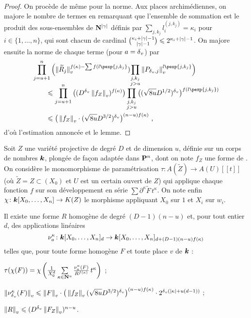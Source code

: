 \documentclass{mpg-preth}
\begin{document}
\begin{proof}
  On procède de même pour la norme. Aux places archimédiennes, on majore le
  nombre de termes en remarquant que l'ensemble de sommation est le produit des
  sous-ensembles de $\mathbf{N}^{\left\lvert\gamma\right\rvert}$ définis par $\sum_{j, k_j} l_i^ {(j, k_j)}
  = \kappa_i$ pour $i \in \{1,\ldots,n\}$, qui sont chacun de cardinal
  $\binom{\kappa_i + \left\lvert\gamma\right\rvert - 1}{\left\lvert\gamma\right\rvert - 1} \leqslant 2^{\kappa_i +
    \left\lvert\gamma\right\rvert - 1}$. On majore ensuite la norme de chaque terme (pour $a =
  {\delta\smash{_v}}$) par
  \begin{align*}
    & \prod_{j=u+1}^n \left( \nv{\smash{\widetilde R_j}}^{f(\kappa) - \sum
        f(l\pexp{j, k_j}}) \smash{\prod_{\substack{j, k_j \\ j > u}}}
      \nv{P_{\dv, j}}^{l\pexp{j, k_j}} \right) \\
    & \qquad\le \prod_{j=u+1}^n \big( (D^\dv \nv{f_Z})^{f(\kappa)} \big)
      \prod_{\substack{j, k_j \\ j > u}}  \big( (\sqrt{8u} D^{1/2})^\dv
      \big)^{f(l\pexp{j, k_j})} \\
    & \qquad\le \big( \nv{f_Z} \cdot (\sqrt{8u}D^{3/2})^\dv
      \big)^{(n-u)f(\kappa)} \pmm,
  \end{align*}
  d'où l'estimation annoncée et le lemme.
\end{proof}

\begin{lem} \label{l-param}
  Soit $Z$ une variété projective de degré $D$ et de dimension $u$, définie
  sur un corps de nombres $\boldsymbol{k}$, plongée de façon adaptée dans $\mathbf{P}^n$, dont
  on note $f_Z$ une forme de . On considère le monomorphisme de
  paramétrisation $\tau \colon A(\widetilde Z) \to A(U)[[t]]$ (où $\widetilde Z
  = Z \subset (X_0)$ et $U$ est un certain ouvert de $Z$) qui applique chaque
  fonction $f$ sur son développement en série $\sum \partial^\kappa \tilde F \,
  t^\kappa$.  On note enfin $\chi \colon \boldsymbol{k}[X_0, \ldots, X_n] \to K(Z)$ le
  morphisme appliquant $X_0$ sur $1$ et $X_i$ sur $w_i$.

  Il existe une forme $R$ homogène de degré $(D-1)(n-u)$ et, pour tout entier
  $d$, des applications linéaires \[ \nu_a^\kappa \colon \boldsymbol{k}[X_0, \ldots,
  X_n]_d \to \boldsymbol{k}[X_0, \ldots, X_n]_{d + (D-1)(n-u)f(\kappa)} \] telles que,
  pour toute forme homogène $F$ et toute place $v$ de $\boldsymbol{k}$ :
  \begin{enumthm}
    \item $\tau(\chi(F)) = \chi\left( \frac1{X_0^d} \sum\limits_{\kappa \in
        \mathbf{N}^u} \frac {\nu_a^\kappa(F)} {R^{f(\kappa)}} \, t^\kappa \right)$  ;
    \item $\left\lVert\nu_{\delta\smash{_v}}^\kappa(F)\right\rVert_{v} \leqslant \left\lVert F\right\rVert_{v} \cdot \big( \left\lVert f_Z\right\rVert_{v}
      (\sqrt{8u}D^{3/2})^{\delta\smash{_v}} \big)^{(n-u)f(\kappa)} \cdot 2^{{\delta\smash{_v}} (\left\lvert\kappa\right\rvert +
        u(d-1))}$ ; \label{i-norme}
    \item $\left\lVert R\right\rVert_{v} \leqslant (D^{\delta\smash{_v}} \left\lVert F_Z\right\rVert_{v})^{n-u}$.
  \end{enumthm}
\end{lem}
\end{document}
